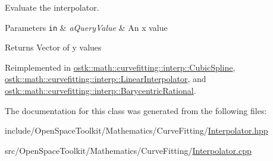 Evaluate the interpolator. 


\begin{DoxyParams}[1]{Parameters}
\mbox{\tt in}  & {\em a\+Query\+Value} & An x value \\
\hline
\end{DoxyParams}
\begin{DoxyReturn}{Returns}
Vector of y values 
\end{DoxyReturn}


Reimplemented in \hyperlink{classostk_1_1math_1_1curvefitting_1_1interp_1_1_cubic_spline_a9cd7d809db55125256a73582cb040e4f}{ostk\+::math\+::curvefitting\+::interp\+::\+Cubic\+Spline}, \hyperlink{classostk_1_1math_1_1curvefitting_1_1interp_1_1_linear_interpolator_ade4cbbc6da45e0dedd71d86a45258512}{ostk\+::math\+::curvefitting\+::interp\+::\+Linear\+Interpolator}, and \hyperlink{classostk_1_1math_1_1curvefitting_1_1interp_1_1_barycentric_rational_ac4924f9afb399ee21f12f2d9bf381da1}{ostk\+::math\+::curvefitting\+::interp\+::\+Barycentric\+Rational}.



The documentation for this class was generated from the following files\+:\begin{DoxyCompactItemize}
\item 
include/\+Open\+Space\+Toolkit/\+Mathematics/\+Curve\+Fitting/\hyperlink{_interpolator_8hpp}{Interpolator.\+hpp}\item 
src/\+Open\+Space\+Toolkit/\+Mathematics/\+Curve\+Fitting/\hyperlink{_interpolator_8cpp}{Interpolator.\+cpp}\end{DoxyCompactItemize}
